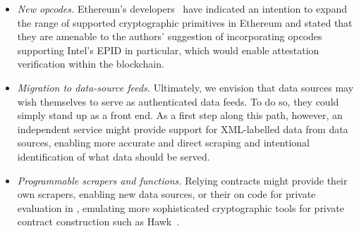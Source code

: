 \begin{itemize}
\item{\em New opcodes.} Ethereum's developers~\cite{Buterinpersonal} have indicated an intention to expand the range of supported cryptographic primitives in Ethereum and stated that they are amenable to the authors' suggestion of incorporating opcodes supporting Intel's EPID in particular, which would enable attestation verification within the blockchain. 
\item{\em Migration to data-source feeds.} Ultimately, we envision that data sources may wish themselves to serve as authenticated data feeds. To do so, they could simply stand up \tc as a front end. As a first step along this path, however, an independent \tc service might provide support for XML-labelled data from data sources, enabling more accurate and direct scraping and intentional identification of what data should be served.  
\item{\em Programmable scrapers and functions.} Relying contracts might provide their own scrapers, enabling new data sources, or their on code for private evaluation in \tc, emulating more sophisticated cryptographic tools for private contract construction such as Hawk~\cite{}. 
\end{itemize}


